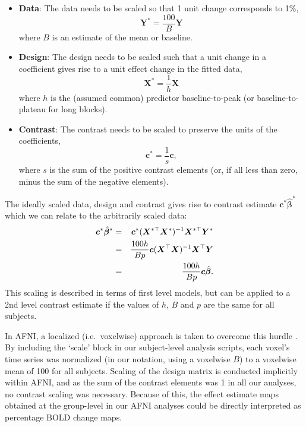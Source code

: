 \begin{itemize}
\item {\bf Data}: The data needs to be scaled so that 1 unit change corresponds to 1\%, 
\begin{equation}
\label{eq:SC_sup_data_scale}
\bm{Y}^{*} = \frac{100}{B} \bm{Y}
\end{equation}
where $B$ is an estimate of the mean or baseline.
\item {\bf Design}:  The design needs to be scaled such that a unit change in a coefficient gives rise to a unit effect change in the fitted data, 
\begin{equation}
\label{eq:SC_sup_design_scale}
\bm{X}^{*} = \frac{1}{h} \bm{X}
\end{equation}
where $h$ is the (assumed common) predictor baseline-to-peak (or baseline-to-plateau for long blocks).
\item {\bf Contrast}: The contrast needs to be scaled to preserve the units of the coefficients, 
\begin{equation}
\label{eq:SC_sup_contrast_scale}
\bm{c}^*=\frac{1}{s}\bm{c},
\end{equation}
where $s$ is the sum of the positive contrast elements (or, if all less than zero, minus the sum of the negative elements).
\end{itemize}

  The ideally scaled data, design and contrast gives rise to contrast estimate $\bm{c}^*\hat{\bm{\beta}}^*$ which we can relate to the arbitrarily scaled data:
\begin{eqnarray}
\label{eq:SC_sup_ideal_scale}
\bm{c}^*\hat{\bm{\beta}}^* &=& \bm{c}^*(\bm{X}^{*\top}\bm{X}^*)^{-1}\bm{X}^{*\top}\bm{Y}^* \notag\\
                          &=& \frac{100h}{Bp}\bm{c}(\bm{X}^{\top}\bm{X})^{-1}\bm{X}^{\top}\bm{Y} \notag\\
                          &=& \frac{100h}{Bp}\bm{c}\hat{\bm{\beta}}.
\end{eqnarray}
This scaling is described in terms of first level models, but can be applied to a 2nd level contrast estimate if the values of $h$, $B$ and $p$ are the same for all subjects.

In AFNI, a localized (i.e.\ voxelwise) approach is taken to overcome this hurdle \citep{Chen2017-sb}. By including the `scale' block in our subject-level analysis scripts, each voxel's time series was normalized (in our notation, using a voxelwise $B$) to a voxelwise mean of 100 for all subjects. Scaling of the design matrix is conducted implicitly within AFNI, and as the sum of the contrast elements was 1 in all our analyses, no contrast scaling was necessary. Because of this, the effect estimate maps obtained at the group-level in our AFNI analyses could be directly interpreted as percentage BOLD change maps. 

